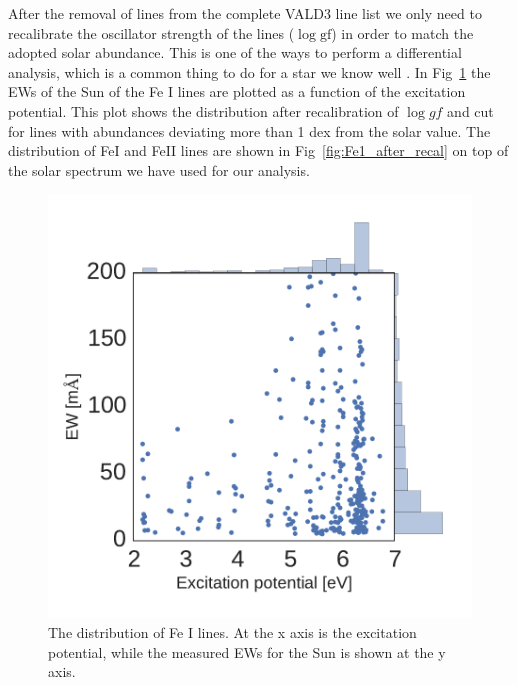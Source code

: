 \documentclass{aa}
\begin{document}
After the removal of lines from the complete VALD3 line list we only
need to recalibrate the oscillator strength of the lines ($\log
\mathrm{gf}$) in order to match the adopted solar abundance. This is
one of the ways to perform a differential analysis, which is a common
thing to do for a star we know well \citep{Sousa2008a,Onehag2012}.
In Fig~\ref{fig:Fe1_before_recal} the EWs of the Sun of the Fe I
lines are plotted as a function of the excitation potential. This
plot shows the distribution after recalibration of $\log gf$ and
cut for lines with abundances deviating more than 1 dex from the
solar value. The distribution of FeI and FeII lines are shown in
Fig~\ref{fig:Fe1_after_recal} on top of the solar spectrum we have used
for our analysis.


\begin{figure}[tpb]
    \centering
    \includegraphics[width=1.0\linewidth]{figures/EWvsEP.pdf}
    \caption{The distribution of Fe I lines. At the x axis is
    the excitation potential, while the measured EWs for the Sun is
    shown at the y axis.}
    \label{fig:Fe1_before_recal}
\end{figure}
\end{document}
